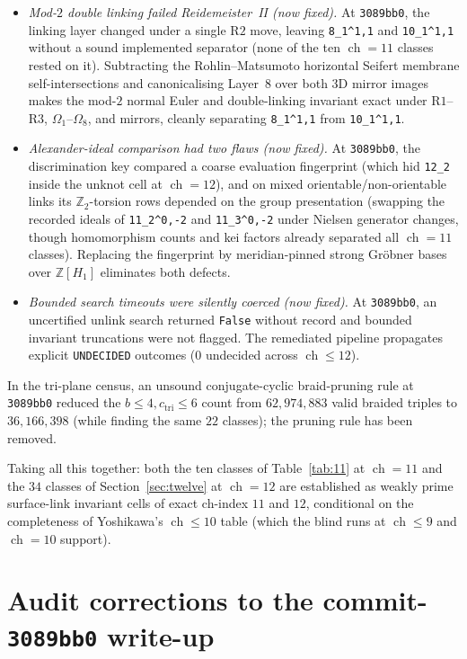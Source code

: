 \documentclass[11pt]{amsart}
\newcommand{\ch}{\operatorname{ch}}
\newcommand{\Z}{\mathbb{Z}}
\newcommand{\lab}[1]{\texttt{#1}}
\theoremstyle{plain}
\theoremstyle{remark}
\begin{document}
\begin{itemize}[leftmargin=*]
\item \emph{Mod-$2$ double linking failed Reidemeister~II (now fixed).} At \texttt{3089bb0}, the linking layer
changed under a single $\mathrm{R2}$ move, leaving \lab{8\_1\^{}1,1} and \lab{10\_1\^{}1,1} without a sound
implemented separator (none of the ten $\ch=11$ classes rested on it). Subtracting the Rohlin--Matsumoto
horizontal Seifert membrane self-intersections and canonicalising Layer~$8$ over both 3D mirror images makes
the mod-$2$ normal Euler and double-linking invariant exact under $\mathrm{R1}$--$\mathrm{R3}$,
$\Omega_1$--$\Omega_8$, and mirrors, cleanly separating \lab{8\_1\^{}1,1} from \lab{10\_1\^{}1,1}.
\item \emph{Alexander-ideal comparison had two flaws (now fixed).} At \texttt{3089bb0}, the discrimination
key compared a coarse evaluation fingerprint (which hid \lab{12\_2} inside the unknot cell at $\ch=12$), and
on mixed orientable/non-orientable links its $\Z_2$-torsion rows depended on the group presentation (swapping
the recorded ideals of \lab{11\_2\^{}0,-2} and \lab{11\_3\^{}0,-2} under Nielsen generator changes, though
homomorphism counts and kei factors already separated all $\ch=11$ classes). Replacing the fingerprint by
meridian-pinned strong Gr\"obner bases over $\Z[H_1]$ eliminates both defects.
\item \emph{Bounded search timeouts were silently coerced (now fixed).} At \texttt{3089bb0}, an uncertified
unlink search returned \texttt{False} without record and bounded invariant truncations were not flagged. The
remediated pipeline propagates explicit \lab{UNDECIDED} outcomes ($0$ undecided across $\ch\le 12$).
\end{itemize}

In the tri-plane census, an unsound conjugate-cyclic braid-pruning rule at \texttt{3089bb0} reduced the
$b\le 4, c_{\mathrm{tri}}\le 6$ count from $62{,}974{,}883$ valid braided triples to $36{,}166{,}398$ (while
finding the same $22$ classes); the pruning rule has been removed.

Taking all this together: both the ten classes of Table~\ref{tab:11} at $\ch=11$ and the $34$ classes of
Section~\ref{sec:twelve} at $\ch=12$ are established as weakly prime surface-link invariant cells of exact
ch-index $11$ and $12$, conditional on the completeness of Yoshikawa's $\ch\le 10$ table (which the blind runs
at $\ch\le 9$ and $\ch=10$ support).

\section{Audit corrections to the commit-\texttt{3089bb0} write-up}\label{sec:corrections}
\end{document}
